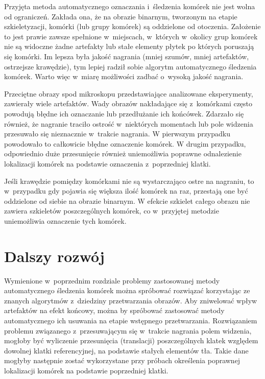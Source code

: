 \documentclass[declaration,shortabstract,mgr]{iithesis}
\begin{document}
Przyjęta metoda automatycznego oznaczania i~śledzenia komórek nie jest wolna od ograniczeń.
Zakłada ona, że na obrazie binarnym, tworzonym na etapie szkieletyzacji, komórki (lub grupy komórek) są oddzielone od otoczenia.
Założenie to jest prawie zawsze spełnione w~miejscach, w~których w~okolicy grup komórek nie są widoczne żadne artefakty lub stałe elementy płytek po których poruszają się komórki.
Im lepsza była jakość nagrania (mniej szumów, mniej artefaktów, ostrzejsze krawędzie), tym lepiej radził sobie algorytm automatycznego śledzenia komórek.
Warto więc w~miarę możliwości zadbać o~wysoką jakość nagrania.

Przeciętne obrazy spod mikroskopu przedstawiające analizowane eksperymenty, zawierały wiele artefaktów.
Wady obrazów nakładające się z~komórkami często powodują błędne ich oznaczanie lub przedłużanie ich końcówek.
Zdarzało się również, że nagranie traciło ostrość w~niektórych momentach lub pole widzenia przesuwało się nieznacznie w~trakcie nagrania.
W pierwszym przypadku powodowało to całkowicie błędne oznaczenie komórek.
W drugim przypadku, odpowiednio duże przesunięcie również uniemożliwia poprawne odnalezienie lokalizacji komórek na podstawie oznaczenia z~poprzedniej klatki.

Jeśli krawędzie pomiędzy komórkami nie są wystarczająco ostre na nagraniu, to w~przypadku gdy pojawia się większa ilość komórek na raz, przestają one być oddzielone od siebie na obrazie binarnym.
W efekcie szkielet całego obrazu nie zawiera szkieletów poszczególnych komórek, co w~przyjętej metodzie uniemożliwia oznaczenie tych komórek.

\section{Dalszy rozwój}

Wymienione w~poprzednim rozdziale problemy zastosowanej metody automatycznego śledzenia komórek można spróbować rozwiązać korzystając ze znanych algorytmów z~dziedziny przetwarzania obrazów.
Aby zniwelować wpływ artefaktów na efekt końcowy, można by spróbować zastosować metody automatycznego ich usuwania na etapie wstępnego przetwarzania\cite{paper:removing-artifacts}.
Rozwiązaniem problemu związanego z~przesuwającym się w~trakcie nagrania polem widzenia, mogłoby być wyliczenie przesunięcia (translacji) poszczególnych klatek względem dowolnej klatki referencyjnej, na podstawie stałych elementów tła.
Takie dane mogłyby następnie zostać wykorzystane przy próbach określenia poprawnej lokalizacji komórek na podstawie poprzedniej klatki.
\end{document}
